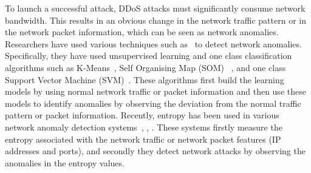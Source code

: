 To launch a successful attack, DDoS attacks must significantly consume network bandwidth. This results in an obvious change in the network traffic pattern or in the network packet information, which can be seen as network anomalies. Researchers have used various techniques such as~\cite{automated-detection:2016, UBL:2012, cloud-malware:2016} to detect network anomalies.
Specifically, they have used unsupervised learning and one class classification algorithms such as K-Means~\cite{automated-detection:2016}, Self Organising Map (SOM)~\cite{UBL:2012} , and one class Support Vector Machine (SVM)~\cite{cloud-malware:2016}. 
These algorithms first build the learning models by using normal network traffic or packet information and then use these models to identify anomalies by observing the deviation from the normal traffic pattern or packet information. 
Recently, entropy has been used in various network anomaly detection systems~\cite{entorpy_based_detection_5:2014}, \cite{entorpy_based_detection_3:2017}, \cite{entorpy_based_detection_4:2017}. These systems firstly measure the entropy associated with the network traffic or network packet features (IP addresses and ports), and secondly they detect network attacks by observing the anomalies in the entropy values.

